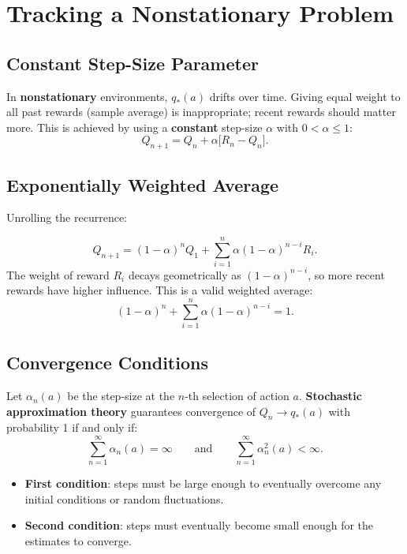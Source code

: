 \documentclass[11pt,a4paper]{article}
\theoremstyle{definition}
\theoremstyle{plain}
\theoremstyle{remark}
\begin{document}
\section{Tracking a Nonstationary Problem}

\subsection{Constant Step-Size Parameter}

In \textbf{nonstationary} environments, $q_*(a)$ drifts over time. Giving equal weight to all past rewards (sample average) is inappropriate; recent rewards should matter more. This is achieved by using a \textbf{constant} step-size $\alpha$ with $0 < \alpha \le 1$:
\[
    Q_{n+1} = Q_n + \alpha\bigl[R_n - Q_n\bigr].
\]

\subsection{Exponentially Weighted Average}

Unrolling the recurrence:
\begin{tcolorbox}[colback=blue!5!white,colframe=blue!60!black,title=\textbf{Exponentially Weighted (Recency-Biased) Average}]
\[
    Q_{n+1} = (1-\alpha)^n Q_1 + \sum_{i=1}^{n} \alpha(1-\alpha)^{n-i} R_i. %
\]
The weight of reward $R_i$ decays geometrically as $(1-\alpha)^{n-i}$, so more recent rewards have higher influence. This is a valid weighted average: %
\[
    (1-\alpha)^n + \sum_{i=1}^{n} \alpha(1-\alpha)^{n-i} = 1. %
\]
\end{tcolorbox}

\subsection{Convergence Conditions}

Let $\alpha_n(a)$ be the step-size at the $n$-th selection of action $a$. \textbf{Stochastic approximation theory} guarantees convergence of $Q_n \to q_*(a)$ with probability 1 if and only if:
\[
    \sum_{n=1}^{\infty} \alpha_n(a) = \infty
    \qquad \text{and} \qquad
    \sum_{n=1}^{\infty} \alpha_n^2(a) < \infty.
\]

\begin{itemize}
    \item \textbf{First condition}: steps must be large enough to eventually overcome any initial conditions or random fluctuations.
    \item \textbf{Second condition}: steps must eventually become small enough for the estimates to converge.
\end{itemize}
\end{document}
